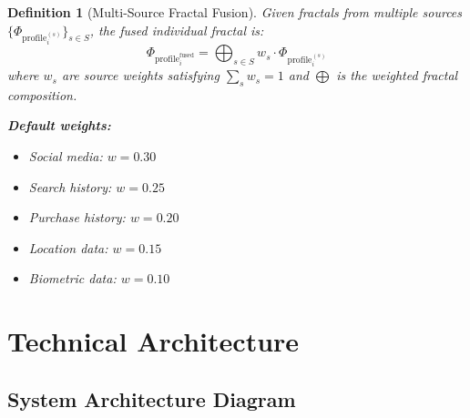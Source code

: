 \documentclass[11pt,twoside]{book}
\newcommand{\ProfileFrac}{\Phi_{\mathrm{profile}}}
\newtheorem{definition}{Definition}[chapter]
\begin{document}
\begin{definition}[Multi-Source Fractal Fusion]
\label{def:multi-source-fusion}
Given fractals from multiple sources $\{\ProfileFrac_i^{(s)}\}_{s \in S}$, the \emph{fused individual fractal} is:
\[
    \ProfileFrac_i^{\text{fused}} = \bigoplus_{s \in S} w_s \cdot \ProfileFrac_i^{(s)}
\]
where $w_s$ are source weights satisfying $\sum_s w_s = 1$ and $\bigoplus$ is the weighted fractal composition.

\textbf{Default weights:}
\begin{itemize}
    \item Social media: $w = 0.30$
    \item Search history: $w = 0.25$
    \item Purchase history: $w = 0.20$
    \item Location data: $w = 0.15$
    \item Biometric data: $w = 0.10$
\end{itemize}
\end{definition}

\chapter{Technical Architecture}
\label{ch:architecture}

\section{System Architecture Diagram}
\end{document}
